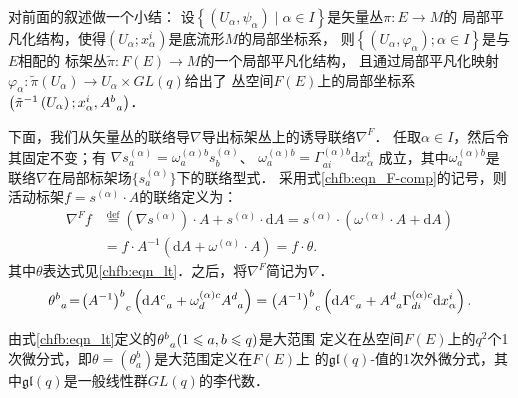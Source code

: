 对前面的叙述做一个小结：
设$\left\{\left(U_{\alpha}, \psi_{\alpha}\right) \mid \alpha \in I\right\}$是矢量丛$\pi: E \rightarrow M$的
局部平凡化结构，使得$\left(U_{\alpha} ; x_{\alpha}^{i}\right)$是底流形$M$的局部坐标系，
则$\left\{\left(U_{\alpha}, \varphi_{\alpha}\right) ; \alpha \in I\right\}$是与$E$相配的
标架丛$\tilde{\pi}: F(E) \rightarrow M$的一个局部平凡化结构，
且通过局部平凡化映射$\varphi_{\alpha}: \tilde{\pi}\left(U_{\alpha}\right) \rightarrow U_{\alpha} \times GL(q)$给出了
丛空间$F(E)$上的局部坐标系$\left(\tilde{\pi}^{-1}\left(U_{\alpha}\right) ; x_{\alpha}^{i}, A_{\hphantom{a}a}^{b}\right)$．


下面，我们从矢量丛的联络导$\nabla$导出标架丛上的诱导联络$\nabla^F$．
任取$\alpha \in I$，然后令其固定不变；有 
$ \nabla s_{a}^{(\alpha)}=\omega_{a}^{(\alpha) b} s_{b}^{(\alpha)}$、 
$ \omega_{a}^{(\alpha) b}=\Gamma_{a i}^{(\alpha) b} \mathrm{d} x_{\alpha}^{i} $
成立，其中$\omega_{a}^{(\alpha) b}$是联络$\nabla$在局部标架场$\{s_{a}^{(\alpha)}\}$下的联络型式．
采用式\eqref{chfb:eqn_F-comp}的记号，则活动标架$f=s^{(\alpha)} \cdot A$的联络定义为： 
\begin{equation}\label{chfb:eqn_Frame-connection}
\begin{aligned}
    \nabla^F f & \overset{\mathrm {def}}{=}\left(\nabla s^{(\alpha)}\right) \cdot A + s^{(\alpha)} \cdot \mathrm{d} A
    =s^{(\alpha)} \cdot \left(\omega^{(\alpha)} \cdot A+\mathrm{d} A\right)  \\
    & =f \cdot A^{-1}\left(\mathrm{d} A+\omega^{(\alpha)} \cdot A\right)
    =f \cdot \theta .    
\end{aligned}\end{equation}
其中$\theta$表达式见\eqref{chfb:eqn_lt}．之后，将$\nabla^F$简记为$\nabla$．
\begin{equation}\label{chfb:eqn_lt}
    \theta_{\hphantom{a}a}^{b}\! =\! \left(A^{-1}\right)_{\hphantom{a}c}^{b}
    \left(\mathrm{d} A_{\hphantom{a}a}^{c}+\omega_{d}^{(\alpha) c} A_{\hphantom{a}a}^{d} \right) 
    =\left(A^{-1}\right)_{\hphantom{a}c}^{b}\left(\mathrm{d} A_{\hphantom{a}a}^{c}+A_{\hphantom{a}a}^{d}
     \Gamma_{d i}^{(\alpha) c} \mathrm{d} x_{\alpha}^{i}\right) .
\end{equation}


\begin{theorem}\label{chfb:thm_ltg}
由式\eqref{chfb:eqn_lt}定义的$\theta_{\hphantom{a}a}^{b} (1 \leqslant a,b \leqslant q)$是大范围
定义在丛空间$F(E)$上的$q^{2}$个1次微分式，即$\theta=(\theta_{a}^{b})$是大范围定义在$F(E)$上
的$\mathfrak{g l}(q)$-值的1次外微分式，其中$\mathfrak{gl}(q)$是一般线性群$GL(q)$的李代数．
\end{theorem}

